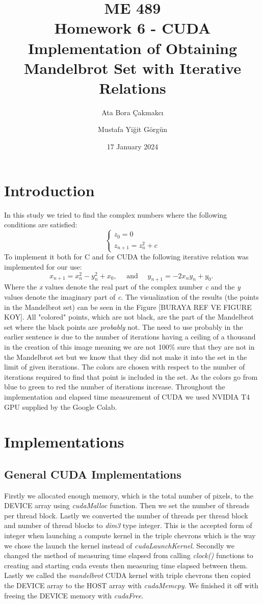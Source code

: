 \documentclass{report}
\title{ME 489\\ Homework 6 - CUDA Implementation of Obtaining Mandelbrot Set with Iterative Relations}
\author{Ata Bora Çakmakcı}
\author{Mustafa Yiğit Görgün}
\affil{Middle East Technical University}
\date{17 January 2024}
\begin{document}
\maketitle
\tableofcontents
\chapter{Introduction}
In this study we tried to find the complex numbers where the following conditions are satisfied:
$$
\left\{\begin{array}{l}
z_0=0 \\
z_{n+1}=z_n^2+c
\end{array}\right.
$$
To implement it both for C and for CUDA the following iterative relation was implemented for our use:
$$
x_{n+1}=x_n^2-y_n^2+x_0, \quad \text { and } \quad y_{n+1}=-2 x_n y_n+y_0 \text {. }
$$
Where the \emph{x} values denote the real part of the complex number \emph{c} and the \emph{y} values denote the imaginary part of \emph{c}. The visualization of the results (the points in the Mandelbrot set) can be seen in the Figure [BURAYA REF VE FIGURE KOY]. All "colored" points, which are not black, are the part of the Mandelbrot set where the black points are \emph{probably} not. The need to use probably in the earlier sentence is due to the number of iterations having a ceiling of a thousand in the creation of this image meaning we are not 100\% sure that they are not in the Mandelbrot set but we know that they did not make it into the set in the limit of given iterations. The colors are chosen with respect to the number of iterations required to find that point is included in the set. As the colors go from blue to green to red the number of iterations increase.
Throughout the implementation and elapsed time measurement of CUDA we used NVIDIA T4 GPU supplied by the Google Colab.

\chapter{Implementations}
\section{General CUDA Implementations}
Firstly we allocated enough memory, which is the total number of pixels, to the DEVICE array using \emph{cudaMalloc} function. Then we set the number of threads per thread block. Lastly we converted the number of threads per thread block and number of thread blocks to \emph{dim3} type integer. This is the accepted form of integer when launching a compute kernel in the triple chevrons which is the way we chose the launch the kernel instead of \emph{cudaLaunchKernel}. 
Secondly we changed the method of measuring time elapsed from calling \emph{clock()} functions to creating and starting cuda events then measuring time elapsed between them.
Lastly we called the \emph{mandelbrot} CUDA kernel with triple chevrons then copied the DEVICE array to the HOST array with \emph{cudaMemcpy}. We finished it off with freeing the DEVICE memory with \emph{cudaFree}.
\end{document}
